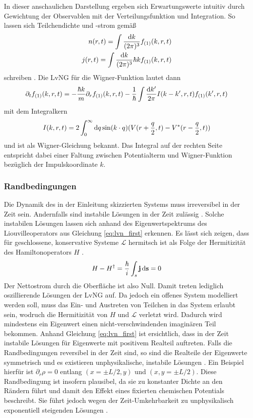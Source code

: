 In dieser anschaulichen Darstellung ergeben sich Erwartungswerte intuitiv durch Gewichtung der Observablen mit der Verteilungsfunktion und Integration. So lassen sich Teilchendichte und -strom gemäß
\begin{align*}
  n(r,t) = \int \frac{\mathop{}\!\mathrm{d} k}{(2\pi)^3}f_{(1)}(k,r,t) \\
  j(r,t) = \int \frac{\mathop{}\!\mathrm{d} k}{(2\pi)^3}\hbar k f_{(1)}(k,r,t)
\end{align*}
schreiben \cite{modern}. Die LvNG für die Wigner-Funktion lautet dann \cite{frensley2, failure}
\begin{equation}
  \partial_t f_{(1)}(k,r,t) = -\frac{\hbar k}{m}\partial_r f_{(1)}(k,r,t) - \frac{1}{\hbar} \int \frac{\mathop{}\!\mathrm{d} k'}{2\pi}I(k-k',r,t)f_{(1)}(k',r,t)
  \label{eq:wigner}
\end{equation}
mit dem Integralkern
\begin{equation*}
  I(k,r,t) = 2\int_0^{\infty} \mathop{}\!\mathrm{d} q \sin(k\cdot q) (V(r+\frac{q}{2},t) - V^*(r-\frac{q}{2},t))
\end{equation*}
und ist als Wigner-Gleichung bekannt. Das Integral auf der rechten Seite entspricht dabei einer Faltung zwischen Potentialterm und Wigner-Funktion bezüglich der Impulskoordinate $k$.

\subsubsection{Randbedingungen}
\label{sec:RB}
Die Dynamik des in der Einleitung skizzierten Systems muss irreversibel in der Zeit sein. Andernfalls sind instabile Lösungen in der Zeit zulässig \cite{frensley2}. Solche instabilen Lösungen lassen sich anhand des Eigenwertspektrums des Liouvilleoperators aus Gleichung \eqref{eq:lvn_first} erkennen. Es lässt sich zeigen, dass für geschlossene, konservative Systeme $\mathcal{L}$ hermitsch ist als Folge der Hermitizität des Hamiltonoperators $H$ \cite{frensley2}.
\begin{align}
  H- H^{\dagger} = \frac{\hbar}{i}\int_s \vb{j}\mathop{}\!\mathrm{d}\vb{s} = 0
\end{align}
Der Nettostrom durch die Oberfläche ist also Null. Damit treten lediglich oszillierende Lösungen der LvNG auf. Da jedoch ein offenes System modelliert werden soll, muss das Ein- und Austreten von Teilchen in das System erlaubt sein, wodruch die Hermitizität von $H$ und $\mathcal{L}$ verletzt wird. Dadurch wird mindestens ein Eigenwert einen nicht-verschwindenden imaginären Teil bekommen. Anhand Gleichung \eqref{eq:lvn_first} ist ersichtlich, dass in der Zeit instabile Lösungen für Eigenwerte mit positivem Realteil auftreten. Falls die Randbedingungen reversibel in der Zeit sind, so sind die Realteile der Eigenwerte symmetrisch und es existieren unphysikalische, instabile Lösungen \cite{frensley2}. Ein Beispiel hierfür ist $\partial_r \rho = 0$ entlang $(x=\pm L/2, y)$ und $(x,y=\pm L/2)$. Diese Randbedingung ist insofern plausibel, da sie zu konstanter Dichte an den Rändern führt und damit den Effekt eines fixierten chemischen Potentials beschreibt. Sie führt jedoch wegen der Zeit-Umkehrbarkeit zu unphysikalisch exponentiell steigenden Lösungen \cite{frensley2}.

